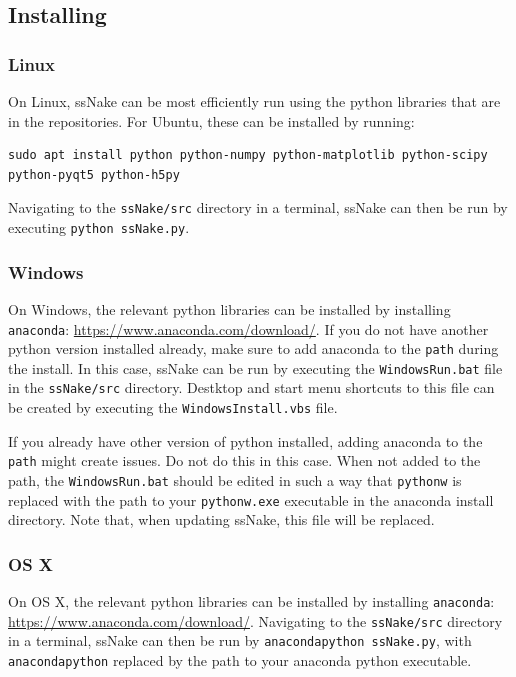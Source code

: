 \documentclass[11pt,a4paper]{article}
\begin{document}
\subsection{Installing}
\subsubsection{Linux}
On Linux, ssNake can be most efficiently run using the python libraries that are in the
repositories. For Ubuntu, these can be installed by running:
\begin{verbatim}
sudo apt install python python-numpy python-matplotlib python-scipy
python-pyqt5 python-h5py
\end{verbatim}
Navigating to the \texttt{ssNake/src} directory in a terminal, ssNake can then be run
by executing \texttt{python ssNake.py}.

\subsubsection{Windows}
On Windows, the relevant python libraries can be installed by installing \texttt{anaconda}:
\url{https://www.anaconda.com/download/}. If you do not have another python version installed
already, make sure to add anaconda to the \texttt{path} during the install. In this case, ssNake can
be run by executing the \texttt{WindowsRun.bat} file in the \texttt{ssNake/src} directory. Destktop
and start menu shortcuts to this file can be created by executing the \texttt{WindowsInstall.vbs}
file.

If you already have other version of python installed, adding anaconda to the \texttt{path} might
create issues. Do not do this in this case. When not added to the path, the \texttt{WindowsRun.bat}
should be edited in such a way that \texttt{pythonw} is replaced with the path to your
\texttt{pythonw.exe} executable in the anaconda install directory. Note that, when updating ssNake,
this file will be replaced.

\subsubsection{OS X}
On OS X, the relevant python libraries can be installed by installing \texttt{anaconda}:
\url{https://www.anaconda.com/download/}. Navigating to the \texttt{ssNake/src} directory in a terminal, ssNake can then be run
by \texttt{anacondapython ssNake.py}, with \texttt{anacondapython} replaced by the path to your
anaconda python executable.
\end{document}
